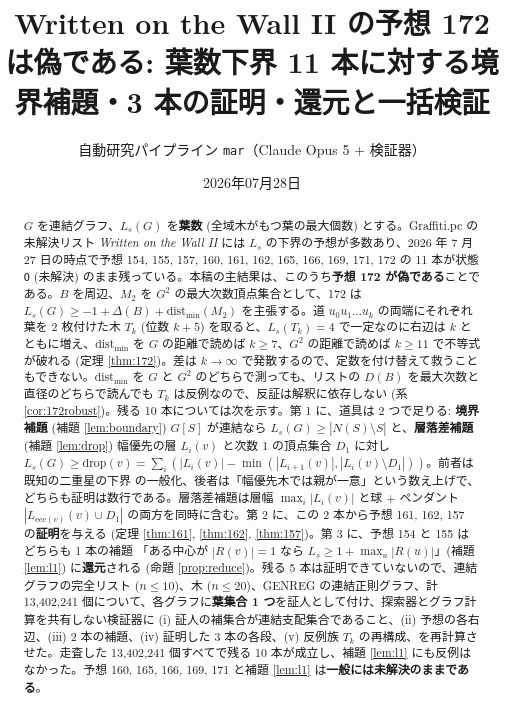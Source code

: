 \documentclass[paper=a4,fontsize=10.5pt,jafontsize=10.5pt]{jlreq}
\title{Written on the Wall II の予想 172 は偽である: 葉数下界 11 本に対する境界補題・3 本の証明・還元と一括検証}
\author{自動研究パイプライン \texttt{mar}（Claude Opus 5 + 検証器）}
\date{2026年07月28日}
\theoremstyle{plain}
\theoremstyle{definition}
\begin{document}
\maketitle

\begin{abstract}
$G$ を連結グラフ、$L_s(G)$ を\textbf{葉数} (全域木がもつ葉の最大個数) とする。Graffiti.pc の未解決リスト \emph{Written on the Wall II} \cite{wowii} には $L_s$ の下界の予想が多数あり、2026 年 7 月 27 日の時点で予想 154, 155, 157, 160, 161, 162, 165, 166, 169, 171, 172 の 11 本が状態 \texttt{O} (未解決) のまま残っている。本稿の主結果は、このうち\textbf{予想 172 が偽である}ことである。$B$ を周辺、$M_2$ を $G^2$ の最大次数頂点集合として、172 は $L_s(G) \ge -1 + \Delta(B) + \mathrm{dist}_{\min}(M_2)$ を主張する。道 $u_0 u_1 \dots u_k$ の両端にそれぞれ葉を 2 枚付けた木 $T_k$ (位数 $k+5$) を取ると、$L_s(T_k) = 4$ で一定なのに右辺は $k$ とともに増え、$\mathrm{dist}_{\min}$ を $G$ の距離で読めば $k \ge 7$、$G^2$ の距離で読めば $k \ge 11$ で不等式が破れる (定理 \ref{thm:172})。差は $k \to \infty$ で発散するので、定数を付け替えて救うこともできない。$\mathrm{dist}_{\min}$ を $G$ と $G^2$ のどちらで測っても、リストの $D(B)$ を最大次数と直径のどちらで読んでも $T_k$ は反例なので、反証は解釈に依存しない (系 \ref{cor:172robust})。残る 10 本については次を示す。第 1 に、道具は 2 つで足りる: \textbf{境界補題} (補題 \ref{lem:boundary}) $G[S]$ が連結なら $L_s(G) \ge |N(S) \setminus S|$ と、\textbf{層落差補題} (補題 \ref{lem:drop}) 幅優先の層 $L_i(v)$ と次数 1 の頂点集合 $D_1$ に対し $L_s(G) \ge \mathrm{drop}(v) = \sum_i (|L_i(v)| - \min(|L_{i+1}(v)|, |L_i(v) \setminus D_1|))$。前者は既知の二重星の下界 \cite{wowii} の一般化、後者は「幅優先木では親が一意」という数え上げで、どちらも証明は数行である。層落差補題は層幅 $\max_i |L_i(v)|$ と球 $+$ ペンダント $|L_{\mathrm{ecc}(v)}(v) \cup D_1|$ の両方を同時に含む。第 2 に、この 2 本から予想 161, 162, 157 の\textbf{証明}を与える (定理 \ref{thm:161}, \ref{thm:162}, \ref{thm:157})。第 3 に、予想 154 と 155 はどちらも 1 本の補題 「ある中心が $|R(v)| = 1$ なら $L_s \ge 1 + \max_u |R(u)|$」(補題 \ref{lem:l1}) に\textbf{還元}される (命題 \ref{prop:reduce})。残る 5 本は証明できていないので、連結グラフの完全リスト ($n \le 10$)、木 ($n \le 20$)、GENREG の連結正則グラフ、計 13,402,241 個について、各グラフに\textbf{葉集合 1 つ}を証人として付け、探索器とグラフ計算を共有しない検証器に (i) 証人の補集合が連結支配集合であること、(ii) 予想の各右辺、(iii) 2 本の補題、(iv) 証明した 3 本の各段、(v) 反例族 $T_k$ の再構成、を再計算させた。走査した 13,402,241 個すべてで残る 10 本が成立し、補題 \ref{lem:l1} にも反例はなかった。予想 160, 165, 166, 169, 171 と補題 \ref{lem:l1} は\textbf{一般には未解決のままである}。
\end{abstract}
\end{document}
